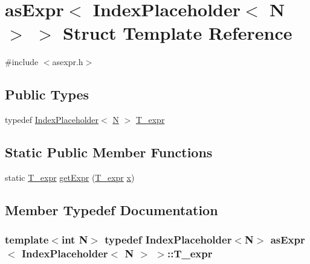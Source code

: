 \hypertarget{structasExpr_3_01IndexPlaceholder_3_01N_01_4_01_4}{}\section{as\+Expr$<$ Index\+Placeholder$<$ N $>$ $>$ Struct Template Reference}
\label{structasExpr_3_01IndexPlaceholder_3_01N_01_4_01_4}


{\ttfamily \#include $<$asexpr.\+h$>$}

\subsection*{Public Types}
\begin{DoxyCompactItemize}
\item 
typedef \hyperlink{classIndexPlaceholder}{Index\+Placeholder}$<$ \hyperlink{polmisc_8c_a0240ac851181b84ac374872dc5434ee4}{N} $>$ \hyperlink{structasExpr_3_01IndexPlaceholder_3_01N_01_4_01_4_a58b5b386e2ac9726aeaafb95e3b3ec75}{T\+\_\+expr}
\end{DoxyCompactItemize}
\subsection*{Static Public Member Functions}
\begin{DoxyCompactItemize}
\item 
static \hyperlink{structasExpr_3_01IndexPlaceholder_3_01N_01_4_01_4_a58b5b386e2ac9726aeaafb95e3b3ec75}{T\+\_\+expr} \hyperlink{structasExpr_3_01IndexPlaceholder_3_01N_01_4_01_4_a1f3e7acadfc46f8c325f2ec6785a63ab}{get\+Expr} (\hyperlink{structasExpr_3_01IndexPlaceholder_3_01N_01_4_01_4_a58b5b386e2ac9726aeaafb95e3b3ec75}{T\+\_\+expr} \hyperlink{vecnorm1_8cc_ac73eed9e41ec09d58f112f06c2d6cb63}{x})
\end{DoxyCompactItemize}


\subsection{Member Typedef Documentation}
\hypertarget{structasExpr_3_01IndexPlaceholder_3_01N_01_4_01_4_a58b5b386e2ac9726aeaafb95e3b3ec75}{}
\subsubsection[{T\+\_\+expr}]{\setlength{\rightskip}{0pt plus 5cm}template$<$int N$>$ typedef {\bf Index\+Placeholder}$<${\bf N}$>$ {\bf as\+Expr}$<$ {\bf Index\+Placeholder}$<$ {\bf N} $>$ $>$\+::{\bf T\+\_\+expr}}\label{structasExpr_3_01IndexPlaceholder_3_01N_01_4_01_4_a58b5b386e2ac9726aeaafb95e3b3ec75}


